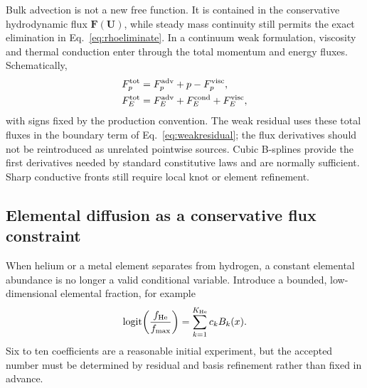 \documentclass[english,a4paper]{my_memo}
\newcommand{\vect}[1]{\mathbf{#1}}
\newcommand{\Ustate}{\vect{U}}
\newcommand{\flux}{\vect{F}}
\begin{document}
Bulk advection is not a new free function.  It is contained in the conservative
hydrodynamic flux \(\flux(\Ustate)\), while steady mass continuity still permits
the exact elimination in Eq.~\eqref{eq:rhoeliminate}.  In a continuum weak
formulation, viscosity and thermal conduction enter through the total momentum
and energy fluxes.  Schematically,
\begin{align}
 F_{p}^{\rm tot} &= F_{p}^{\rm adv}+p-F_{p}^{\rm visc}, \\
 F_{E}^{\rm tot} &= F_{E}^{\rm adv}+F_{E}^{\rm cond}
                    +F_{E}^{\rm visc},
 \label{eq:totalhydroflux}
\end{align}
with signs fixed by the production convention.  The weak residual uses these
total fluxes in the boundary term of Eq.~\eqref{eq:weakresidual}; the flux
derivatives should not be reintroduced as unrelated pointwise sources.  Cubic
B-splines provide the first derivatives needed by standard constitutive laws
and are normally sufficient.  Sharp conductive fronts still require local knot
or element refinement.

\subsection{Elemental diffusion as a conservative flux constraint}

When helium or a metal element separates from hydrogen, a constant elemental
abundance is no longer a valid conditional variable.  Introduce a bounded,
low-dimensional elemental fraction, for example
\begin{equation}
 \operatorname{logit}\!\left(\frac{f_{\rm He}}{f_{\max}}\right)
 =\sum_{k=1}^{K_{\rm He}}c_k B_k(x).
 \label{eq:heparameterization}
\end{equation}
Six to ten coefficients are a reasonable initial experiment, but the accepted
number must be determined by residual and basis refinement rather than fixed in
advance.
\end{document}
